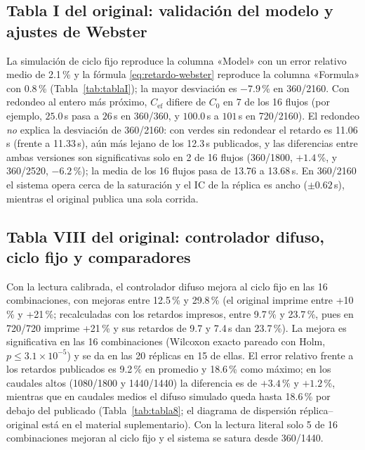 \documentclass[journal]{IEEEtran}
\begin{document}
\subsection{Tabla I del original: validación del modelo y ajustes de Webster}
\label{sec:webster-res}
La simulación de ciclo fijo reproduce la columna «Model» con un error relativo medio de 2.1\,\% y la fórmula \eqref{eq:retardo-webster} reproduce la columna «Formula» con 0.8\,\% (Tabla~\ref{tab:tablaI}); la mayor desviación es $-7.9$\,\% en 360/2160. Con redondeo al entero más próximo, $C_{\mathrm{ef}}$ difiere de $C_0$ en 7 de los 16 flujos (por ejemplo, $25.0$\,s pasa a $26$\,s en 360/360, y $100.0$\,s a $101$\,s en 720/2160). El redondeo \emph{no} explica la desviación de 360/2160: con verdes sin redondear el retardo es 11.06\,s (frente a 11.33\,s), aún más lejano de los 12.3\,s publicados, y las diferencias entre ambas versiones son significativas solo en 2 de 16 flujos (360/1800, $+1.4$\,\%, y 360/2520, $-6.2$\,\%); la media de los 16 flujos pasa de 13.76 a 13.68\,s. En 360/2160 el sistema opera cerca de la saturación y el IC de la réplica es ancho ($\pm0.62$\,s), mientras el original publica una sola corrida.



\subsection{Tabla VIII del original: controlador difuso, ciclo fijo y comparadores}
\label{sec:tabla8}
Con la lectura calibrada, el controlador difuso mejora al ciclo fijo en las 16 combinaciones, con mejoras entre 12.5\,\% y 29.8\,\% (el original imprime entre +10\,\% y +21\,\%; recalculadas con los retardos impresos, entre 9.7\,\% y 23.7\,\%, pues en 720/720 imprime +21\,\% y sus retardos de 9.7 y 7.4\,s dan 23.7\,\%). La mejora es significativa en las 16 combinaciones (Wilcoxon exacto pareado con Holm, $p\le3.1\times10^{-5}$) y se da en las 20 réplicas en 15 de ellas. El error relativo frente a los retardos publicados es 9.2\,\% en promedio y 18.6\,\% como máximo; en los caudales altos (1080/1800 y 1440/1440) la diferencia es de $+3.4$\,\% y $+1.2$\,\%, mientras que en caudales medios el difuso simulado queda hasta 18.6\,\% por debajo del publicado (Tabla~\ref{tab:tabla8}; el diagrama de dispersión réplica--original está en el material suplementario). Con la lectura literal solo 5 de 16 combinaciones mejoran al ciclo fijo y el sistema se satura desde 360/1440.


\end{document}
